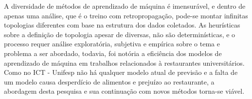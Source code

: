          A diversidade de métodos de aprendizado de máquina é imensurável, e dentro de apenas uma análise, que é o treino com retropropagação, pode-se montar infinitas topologias diferentes com base na estrutura dos dados coletados. 
        As heurísticas sobre a definição de topologia apesar de diversas, não são determinísticas, e o processo requer análise exploratória, subjetiva e empírica sobre o tema e problema a ser abordado, todavia, foi notória a eficiência dos modelos de aprendizado de máquina em trabalhos relacionados à restaurantes universitários. Como no ICT - Unifesp não há qualquer modelo atual de previsão e a falta de um modelo causa desperdício de alimentos e prejuízo ao restaurante, a abordagem desta pesquisa e sua continuação com novos métodos torna-se viável.